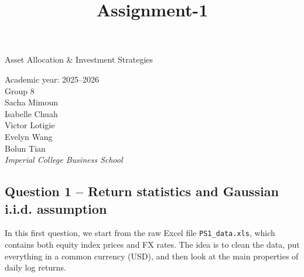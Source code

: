 \documentclass[11pt]{article}
\title{Assignment-1}
\begin{document}
    
    \maketitle
    
    

    \usepackage[utf-8]{inputenc}
\usepackage{amssymb}
\usepackage{amsmath}
\usepackage{fontspec}
\setmainfont{Liberation Serif}
\setsansfont{Liberation Sans}
\setmonofont{Liberation Mono}

\title{}
\author{}
\date{}
\makeatletter
\renewcommand{\maketitle}{}
\makeatother

\thispagestyle{empty}

\begin{center}
\vspace*{4cm}

{\LARGE Asset Allocation \& Investment Strategies \\[0.5cm]}

Academic year: 2025--2026\\[1.5cm]

Group 8\\[0.3cm]
Sacha Mimoun\\
Isabelle Chuah\\
Victor Lotigie\\
Evelyn Wang\\
Bolun Tian\\[1.5cm]

\textit{Imperial College Business School}

\end{center}

\newpage
    \setcounter{secnumdepth}{0}

    \thispagestyle{empty}
\clearpage

\tableofcontents

\newpage

    \hypertarget{question-1-return-statistics-and-gaussian-i.i.d.-assumption}{%
\subsection{Question 1 -- Return statistics and Gaussian i.i.d.
assumption}\label{question-1-return-statistics-and-gaussian-i.i.d.-assumption}}

    In this first question, we start from the raw Excel file
\texttt{PS1\_data.xls}, which contains both equity index prices and FX
rates. The idea is to clean the data, put everything in a common
currency (USD), and then look at the main properties of daily log
returns.
\end{document}
